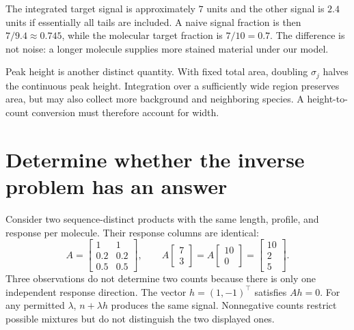 
The integrated target signal is approximately $7$ units and the other signal is $2.4$ units if essentially all tails are included. A naive signal fraction is then $7/9.4\approx0.745$, while the molecular target fraction is $7/10=0.7$. The difference is not noise: a longer molecule supplies more stained material under our model.

Peak height is another distinct quantity. With fixed total area, doubling $\sigma_j$ halves the continuous peak height. Integration over a sufficiently wide region preserves area, but may also collect more background and neighboring species. A height-to-count conversion must therefore account for width.

\section{Determine whether the inverse problem has an answer}
Consider two sequence-distinct products with the same length, profile, and response per molecule. Their response columns are identical:
\begin{equation}
A=\begin{bmatrix}1&1\\0.2&0.2\\0.5&0.5\end{bmatrix},
\qquad
A\begin{bmatrix}7\\3\end{bmatrix}
=A\begin{bmatrix}10\\0\end{bmatrix}
=\begin{bmatrix}10\\2\\5\end{bmatrix}. \label{eq:ambiguous}
\end{equation}
Three observations do not determine two counts because there is only one independent response direction. The vector $h=(1,-1)^\top$ satisfies $Ah=0$. For any permitted $\lambda$, $n+\lambda h$ produces the same signal. Nonnegative counts restrict possible mixtures but do not distinguish the two displayed ones.

